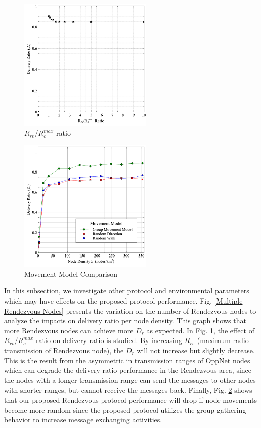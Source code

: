 \begin{figure}[!t]
\centering
\includegraphics[width=2.5in]{Graphs/RcmaxRrv.pdf}
\caption{$R_{rv}$/$R_c^{max}$ ratio}
\label{RrvRcmaxRatio}
\end{figure}

\begin{figure}[!t]
\centering
\includegraphics[width=2.5in]{Graphs/movement.pdf}
\caption{Movement Model Comparison}
\label{Movement Model Comparison}
\end{figure}

In this subsection, we investigate other protocol and environmental parameters which may have effects on the proposed protocol performance.
%
Fig. \ref{Multiple Rendezvous Nodes} presents the variation on the number of Rendezvous nodes to analyze the impacts on delivery ratio per node density.
%
This graph shows that more Rendezvous nodes can achieve more $D_r$ as expected.
%
In Fig. \ref{RrvRcmaxRatio}, the effect of $R_{rv}/R_c^{max}$ ratio on delivery ratio is studied.
% 
By increasing $R_{rv}$ (maximum radio transmission of Rendezvous node), the $D_r$ will not increase but slightly decrease.
%
This is the result from the asymmetric in transmission ranges of OppNet nodes which can degrade the delivery ratio performance in the Rendezvous area, since the nodes with a longer transmission range can send the messages to other nodes with shorter ranges, but cannot receive the messages back.
Finally, Fig. \ref{Movement Model Comparison} shows that our proposed Rendezvous protocol performance will drop if node movements become more random since the proposed protocol utilizes the group gathering behavior to increase message exchanging activities.


